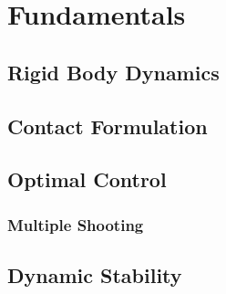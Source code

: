 \section{Fundamentals} \label{sec:fundamentals}

\subsection{Rigid Body Dynamics} \label{sec:fundamentals:rigid}
\subsection{Contact Formulation} \label{sec:fundamentals:contacts}

\subsection{Optimal Control} \label{sec:fundamentals:optimalControl}
\subsubsection{Multiple Shooting} \label{sec:fundamentals:optimalControl:multipleShooting}

\subsection{Dynamic Stability} \label{sec:fundamentals:dynamicStability}

